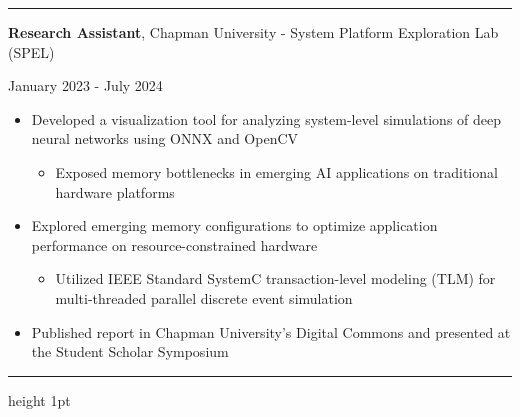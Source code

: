\documentclass[letter]{article}
\begin{document}
    \hrule
    \vspace{4pt}
    \noindent
    \begin{minipage}[c]{0.65\linewidth}
        \noindent \textbf{Research Assistant}, Chapman University - System Platform Exploration Lab (SPEL)
    \end{minipage}
    \begin{minipage}[c]{0.345\linewidth}
        \begin{flushright}
            January 2023 - July 2024
        \end{flushright}
    \end{minipage}
    \noindent
    \begin{itemize}[noitemsep, topsep=0pt]
        \item Developed a visualization tool for analyzing system-level simulations of deep neural networks using ONNX and OpenCV
            \begin{itemize}[noitemsep, topsep=0pt]
            \item Exposed memory bottlenecks in emerging AI applications on traditional hardware platforms
            \end{itemize}
        \item Explored emerging memory configurations to optimize application performance on resource-constrained hardware
            \begin{itemize}[noitemsep, topsep=0pt]
            \item Utilized IEEE Standard SystemC transaction-level modeling (TLM) for multi-threaded parallel discrete event simulation
            \end{itemize}
        \item Published report in Chapman University's Digital Commons and presented at the Student Scholar Symposium
    \end{itemize}
    \medskip

    \medskip
    \vspace{4pt}
    \hrule height 1pt
    \vspace{4pt}
\end{document}
